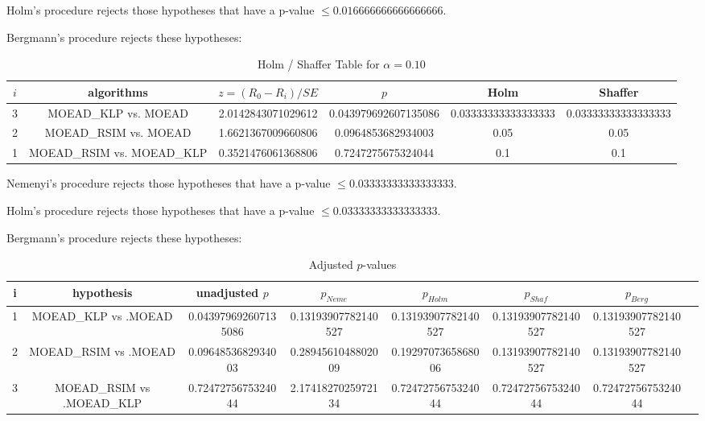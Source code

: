 \documentclass[a4paper,10pt]{article}
\begin{document}
\begin{landscape}
Holm's procedure rejects those hypotheses that have a p-value $\le0.016666666666666666$.


Bergmann's procedure rejects these hypotheses:


\begin{itemize}


\end{itemize}


\begin{table}[!htp]
\centering\tiny
\caption{Holm / Shaffer Table for $\alpha=0.10$}
\begin{tabular}{cccccc}
$i$&algorithms&$z=(R_0 - R_i)/SE$&$p$&Holm&Shaffer\\
\hline
3&MOEAD_KLP vs. MOEAD&2.0142843071029612&0.043979692607135086&0.03333333333333333&0.03333333333333333\\
2&MOEAD_RSIM vs. MOEAD&1.6621367009660806&0.0964853682934003&0.05&0.05\\
1&MOEAD_RSIM vs. MOEAD_KLP&0.3521476061368806&0.7247275675324044&0.1&0.1\\
\hline
\end{tabular}
\end{table}
Nemenyi's procedure rejects those hypotheses that have a p-value $\le0.03333333333333333$.


Holm's procedure rejects those hypotheses that have a p-value $\le0.03333333333333333$.


Bergmann's procedure rejects these hypotheses:


\begin{itemize}


\end{itemize}


\begin{table}[!htp]
\centering\tiny
\caption{Adjusted $p$-values}
\begin{tabular}{cccccccc}
i&hypothesis&unadjusted $p$&$p_{Neme}$&$p_{Holm}$&$p_{Shaf}$&$p_{Berg}$\\
\hline
1&MOEAD_KLP vs .MOEAD&0.043979692607135086&0.13193907782140527&0.13193907782140527&0.13193907782140527&0.13193907782140527\\
2&MOEAD_RSIM vs .MOEAD&0.0964853682934003&0.2894561048802009&0.1929707365868006&0.13193907782140527&0.13193907782140527\\
3&MOEAD_RSIM vs .MOEAD_KLP&0.7247275675324044&2.1741827025972134&0.7247275675324044&0.7247275675324044&0.7247275675324044\\
\hline
\end{tabular}
\end{table}

\end{landscape}
\end{document}
